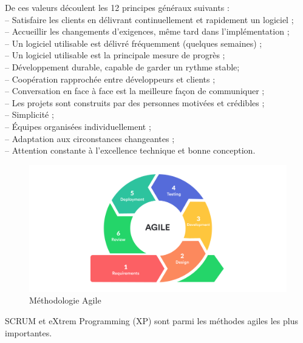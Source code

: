 \documentclass[a4paper, 12pt]{report}
\begin{document}
De ces valeurs découlent les 12 principes généraux suivants : \\
-- Satisfaire les clients en délivrant continuellement et rapidement un logiciel ; \\
-- Accueillir les changements d'exigences, même tard dans l'implémentation ;\\ 
-- Un logiciel utilisable est délivré fréquemment (quelques semaines) ; \\
-- Un logiciel utilisable est la principale mesure de progrès ; \\
-- Développement durable, capable de garder un rythme stable; \\
-- Coopération rapprochée entre développeurs et clients ; \\
-- Conversation en face à face est la meilleure façon de communiquer ; \\ 
-- Les projets sont construits par des personnes motivées et crédibles ; \\
-- Simplicité ; \\
-- Équipes organisées individuellement ; \\ 
-- Adaptation aux circonstances changeantes ; \\ 
-- Attention constante à l'excellence technique et bonne conception. \\
\begin{figure}[H]
    \centering
    \includegraphics[width = 1.2\linewidth]{img/agile.jpg}
    \caption{Méthodologie Agile}
\end{figure}\cite{agile}
SCRUM et eXtrem Programming (XP) sont parmi les méthodes agiles les plus importantes. 
\end{document}
